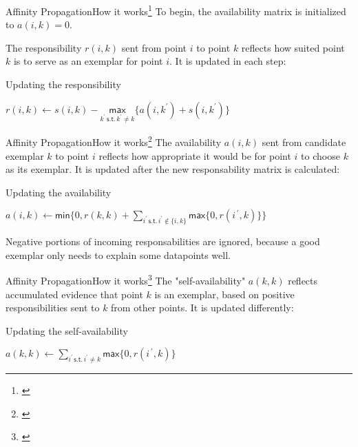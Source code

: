 \documentclass{beamer}
\begin{document}
\begin{frame}{Affinity Propagation}{How it works\footnote{\cite{frey2007clustering}}}
	To begin, the \alert{availability matrix} is initialized to $a(i,k) = 0$.
	
	The \alert{responsibility} $r(i,k)$ sent from point $i$ to point $k$ reflects how suited point $k$ is to serve as an exemplar for point $i$. It is updated in each step:
	
	\begin{block}{Updating the responsibility}
		\begin{center}
			$r(i,k) \leftarrow s(i,k) - \underset{k^\prime\, \mathsf{s.t.}\, k^\prime \neq k}{\mathsf{max}} \{a(i,k^\prime) + s(i,k^\prime)\}$
		\end{center}
	\end{block}
\end{frame}

\begin{frame}{Affinity Propagation}{How it works\footnote{\cite{frey2007clustering}}}
    The \alert{availability} $a(i,k)$ sent from candidate exemplar $k$ to point $i$ reflects how appropriate it would be for point $i$ to choose $k$ as its exemplar. It is updated after the new \alert{responsability matrix} is calculated:
    
    \begin{block}{Updating the availability}
		\begin{center}
			$a(i,k) \leftarrow \mathsf{min}\{0,r(k,k) + \sum\limits_{i^\prime\,\mathsf{s.t.}\, i^\prime \notin \{i,k\}}\mathsf{max}\{0, r(i^{\, \prime} ,k)\}\}$
		\end{center}
    \end{block}
	Negative portions of incoming responsabilities are ignored, because a good exemplar only needs to explain some datapoints well.
\end{frame}

\begin{frame}{Affinity Propagation}{How it works\footnote{\cite{frey2007clustering}}}
    The "\alert{self-availability}" $a(k,k)$ reflects accumulated evidence that point $k$ is an exemplar, based on positive responsibilities sent to $k$ from other points. It is updated differently:
    
    \begin{block}{Updating the self-availability}
    	\begin{center}
    		$a(k,k) \leftarrow \sum\limits_{i^\prime\, \mathsf{s.t.}\, i^\prime \neq k} \mathsf{max} \{0, r(i^{\, \prime} ,k)\}$
    	\end{center}
    \end{block}
\end{frame}
\end{document}
